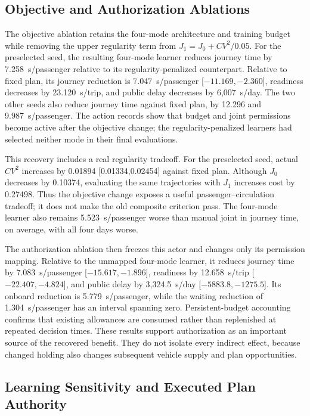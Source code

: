 \subsection{Objective and Authorization Ablations}

The objective ablation retains the four-mode architecture and training budget
while removing the upper regularity term from
\(J_1=J_0+CV^2/0.05\). For the preselected seed, the resulting four-mode learner
reduces journey time by 7.258~s/passenger relative to its regularity-penalized
counterpart. Relative to fixed plan, its journey reduction is
7.047~s/passenger [\(-11.169,-2.360\)], readiness decreases by
23.120~s/trip, and public delay decreases by 6,007~s/day. The two other seeds
also reduce journey time against fixed plan, by 12.296 and 9.987~s/passenger.
The action records show that budget and joint permissions become active after
the objective change; the regularity-penalized learners had selected neither
mode in their final evaluations.

This recovery includes a real regularity tradeoff. For the preselected seed,
actual \(CV^2\) increases by 0.01894 [0.01334,0.02454] against fixed plan.
Although \(J_0\) decreases by 0.10374, evaluating the same trajectories with
\(J_1\) increases cost by 0.27498. Thus the objective change exposes a useful
passenger--circulation tradeoff; it does not make the old composite criterion
pass. The four-mode learner also remains 5.523~s/passenger worse than manual
joint in journey time, on average, with all four days worse.

The authorization ablation then freezes this actor and changes only its
permission mapping. Relative to the unmapped four-mode learner, it reduces
journey time by 7.083~s/passenger [\(-15.617,-1.896\)], readiness by
12.658~s/trip [\(-22.407,-4.824\)], and public delay by
3,324.5~s/day [\(-5883.8,-1275.5\)]. Its onboard reduction is
5.779~s/passenger, while the waiting reduction of 1.304~s/passenger has an
interval spanning zero. Persistent-budget accounting confirms that existing
allowances are consumed rather than replenished at repeated decision times.
These results support authorization as an important source of the recovered
benefit. They do not isolate every indirect effect, because changed holding
also changes subsequent vehicle supply and plan opportunities.

\subsection{Learning Sensitivity and Executed Plan Authority}

